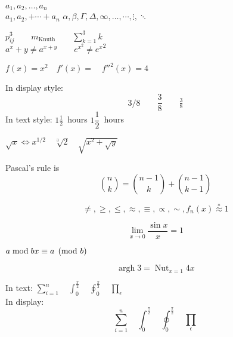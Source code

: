 \documentclass[12pt]{ctexrep}
\DeclareMathOperator{\argh}{argh}
\DeclareMathOperator*{\nut}{Nut}
\begin{document}

$a_1, a_2, \dots, a_n$ \\
$a_1, a_2, + \cdots + a_n$
$\alpha, \beta, \Gamma, \Delta, \infty, \dots, \cdots, \vdots, \ddots$

$p^3_{ij} \qquad
m_\mathrm{Knuth}\qquad
\sum_{k=1}^3 k$\\[5pt]
$a^x+y \neq a^{x+y}\qquad
e^{x^2} \neq {e^x}^2$

$f(x) = x^2 \quad f'(x) = \quad f''^{2}(x) = 4$

In display style:
\[
3/8 \qquad \frac{3}{8} \qquad \tfrac{3}{8}    
\]
In text style:
$1\frac{1}{2}$~hours \qquad $1\dfrac{1}{2}$~hours

$\sqrt{x} \Leftrightarrow x^{1/2} \quad \sqrt[3]{2} \quad \sqrt{x^{2} + \sqrt{y}}$

Pascal's rule is 
\[
\binom{n}{k} = \binom{n-1}{k} + \binom{n-1}{k-1}    
\]

\[
\ne, \ge, \le, \approx, \equiv, \propto, \sim, f_n(x) \stackrel{*}{\approx} 1    
\]

\[
\lim_{x \rightarrow 0}
\frac{\sin x}{x}=1    
\]

$a\bmod b \\ x\equiv a \pmod{b}$

\[
\argh 3 = \nut_{x=1} 4x    
\]

In text:
$\sum_{i=1}^n \quad 
\int_0^{\frac{\pi}{2}} \quad 
\oint_0^{\frac{\pi}{2}} \quad 
\prod_\epsilon $\\
In display:
\[
\sum_{i=1}^n \quad 
\int_0^{\frac{\pi}{2}} \quad 
\oint_0^{\frac{\pi}{2}} \quad 
\prod_\epsilon    
\]
\end{document}
